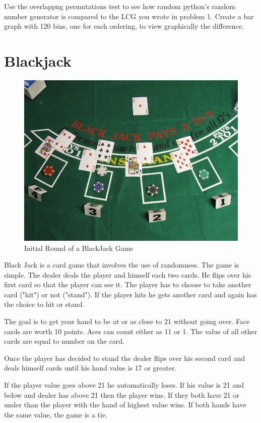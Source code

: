 \begin{problem}
Use the overlappng permutations test to see how random python's random number generator is compared to the LCG you wrote in problem 1.
Create a bar graph with 120 bins, one for each ordering, to view graphically the difference.
\end{problem}

\section*{Blackjack}

\begin{figure}[H]
\includegraphics[scale = .9]{Blackjack_game_1.jpg}
\caption{Initial Round of a BlackJack Game}
\end{figure}

Black Jack is a card game that involves the use of randomness.
The game is simple.
The dealer deals the player and himself each two cards.
He flips over his first card so that the player can see it.
The player has to choose to take another card ("hit") or not ("stand").
If the player hits he gets another card and again has the choice to hit or stand.

The goal is to get your hand to be at or as close to 21 without going over.
Face cards are worth 10 points.
Aces can count either as 11 or 1.
The value of all other cards are equal to number on the card.

Once the player has decided to stand the dealer flips over his second card and deals himself cards until his hand value is 17 or greater. 

If the player value goes above 21 he automatically loses.
If his value is 21 and below and dealer has above 21 then the player wins.
If they both have 21 or under than the player with the hand of highest value wins.
If both hands have the same value, the game is a tie.

